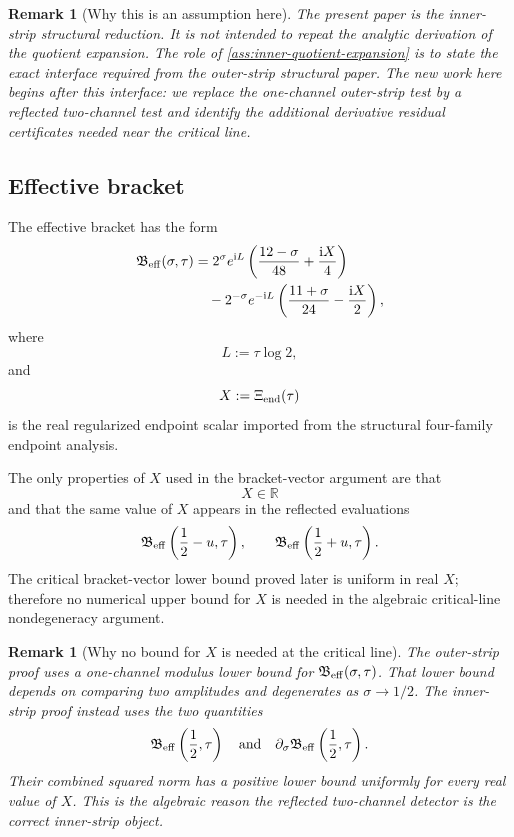 \documentclass[11pt]{article}
\newtheorem{remark}[theorem]{Remark}
\newcommand{\ii}{\mathrm{i}}
\newcommand{\Beff}{\mathfrak B_{\rm eff}}
\begin{document}
\begin{remark}[Why this is an assumption here]
The present paper is the inner-strip structural reduction.  It is not intended
to repeat the analytic derivation of the quotient expansion.  The role of
\cref{ass:inner-quotient-expansion} is to state the exact interface required
from the outer-strip structural paper.  The new work here begins after this
interface: we replace the one-channel outer-strip test by a reflected
two-channel test and identify the additional derivative residual certificates
needed near the critical line.
\end{remark}

\subsection{Effective bracket}

The effective bracket has the form
\[
\begin{aligned}
        \Beff(\sigma,\tau)
        &=
        2^\sigma e^{\ii L}
        \left(
        \frac{12-\sigma}{48}
        +
        \frac{\ii X}{4}
        \right)
\\
        &\quad
        -
        2^{-\sigma}e^{-\ii L}
        \left(
        \frac{11+\sigma}{24}
        -
        \frac{\ii X}{2}
        \right),
\end{aligned}
\]
where
\[
        L:=\tau\log2,
\]
and
\[
        X:=\Xi_{\rm end}(\tau)
\]
is the real regularized endpoint scalar imported from the structural
four-family endpoint analysis.

The only properties of \(X\) used in the bracket-vector argument are that
\[
        X\in\mathbb R
\]
and that the same value of \(X\) appears in the reflected evaluations
\[
        \Beff\left(\frac12-u,\tau\right),
        \qquad
        \Beff\left(\frac12+u,\tau\right).
\]
The critical bracket-vector lower bound proved later is uniform in real \(X\);
therefore no numerical upper bound for \(X\) is needed in the algebraic
critical-line nondegeneracy argument.

\begin{remark}[Why no bound for \(X\) is needed at the critical line]
The outer-strip proof uses a one-channel modulus lower bound for
\(\Beff(\sigma,\tau)\).  That lower bound depends on comparing two amplitudes
and degenerates as \(\sigma\to1/2\).  The inner-strip proof instead uses the
two quantities
\[
        \Beff\left(\frac12,\tau\right)
        \quad\text{and}\quad
        \partial_\sigma\Beff\left(\frac12,\tau\right).
\]
Their combined squared norm has a positive lower bound uniformly for every
real value of \(X\).  This is the algebraic reason the reflected two-channel
detector is the correct inner-strip object.
\end{remark}
\end{document}
